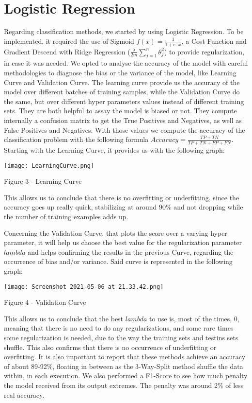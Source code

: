 \documentclass[conference]{IEEEtran}
\begin{document}
\section{Logistic Regression}
Regarding classification methods, we started by using Logistic Regression. To be implemented, it required the use of Sigmoid  \( f(x) = \frac{1}{1+e^-x}\), a Cost Function and Gradient Descend with Ridge Regression (\(\frac{\lambda}{2m}\sum_{j=1}^{n}\theta^2_j\)) to provide regularization, in case it was needed. We opted to analyse the accuracy of the model with careful methodologies to diagnose the bias or the variance of the model, like Learning Curve and Validation Curve. The learning curve provide us the accuracy of the model over different batches of training samples, while the Validation Curve do the same, but over different hyper parameters values instead of different training sets. They are both helpful to assay the model is biased or not. They compute internally a confusion matrix to get the True Positives and Negatives, as well as False Positives and Negatives. With those values we compute the accuracy of the classification problem with the following formula \(Accuracy = \frac{TP+TN}{TP+TN+FP+FN}\). Starting with the Learning Curve, it provides us with the following graph:
\par
\texttt{[image: LearningCurve.png]}
\caption{Figure 3 - Learning Curve}
\par
This allows us to conclude that there is no overfitting or underfitting, since the accuracy goes up really quick, stabilizing at around 90\% and not dropping while the number of training examples adds up. 
\par
Concerning the Validation Curve, that plots the score over a varying hyper parameter, it will help us choose the best value for the regularization parameter \(lambda\) and helps confirming the results in the previous Curve, regarding the occurrence of bias and/or variance. Said curve is represented in the following graph:
\par
\texttt{[image: Screenshot 2021-05-06 at 21.33.42.png]}  
\caption{Figure 4 - Validation Curve}
\par
This allows us to conclude that the best \(lambda\) to use is, most of the times, 0, meaning that there is no need to do any regularizations, and some rare times some regularization is needed, due to the way the training sets and testins sets shuffle. This also confirms that there is no occurrence of underfitting or overfitting.
It is also important to report that these methods achieve an accuracy of about 89-92\%, floating in between as the 3-Way-Split method shuffle the data within, in each execution. We also performed a F1-Score to see how much penalty the model received from its output extremes. The penalty was around 2\% of less real accuracy.  
\end{document}
